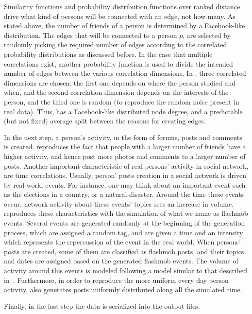 Similarity functions and probability distribution functions over ranked
distance drive what kind of persons will be connected with an edge, not how
many. As stated above, the number of friends of a person is determined by a
Facebook-like distribution. The edges that will be connected to a person $p$,
are selected by randomly picking the required number of edges according to the
correlated probability distributions as discussed before. In the case that
multiple correlations exist, another probability function is used to divide the
intended number of edges between the various correlation dimensions. In \datagen,
three correlated dimensions are chosen: the first one depends on where the
person studied and when, and the second correlation dimension depends on the
interests of the person, and the third one is random (to reproduce the random
noise present in real data). Thus, \datagen has a Facebook-like distributed node
degree, and a predictable (but not fixed) average split between the reasons for
creating edges.

In the next step, a person's activity, in the form of forums, posts and comments
is created. \datagen reproduces the fact that people with a larger number of
friends have a higher activity, and hence post more photos and comments to a
larger number of posts. Another important characteristic of real persons'
activity in social network, are time correlations.  Usually, person' posts
creation in a social network is driven by real world events.  For
instance, one may think about an important event such as the elections in a
country, or a natural disaster. Around the time these events occur, network
activity about these events' topics sees an increase in volume. \datagen
reproduces these characteristics with the simulation of what we name as
flashmob events.  Several events are generated randomly at the beginning of the
generation process, which are assigned a random tag, and are given a time and
an intensity which represents the repercussion of the event in the real world.
When persons' posts are created, some of them are classified as flashmob posts,
and their topics and dates are assigned based on the generated flashmob events.
The volume of activity around this events is modeled following a model similar
to that described in~\cite{DBLP:conf/kdd/LeskovecBKT08}. Furthermore, in order to reproduce the
more uniform every day person activity, \datagen also generates posts uniformly
distributed along all the simulated time.

Finally, in the last step the data is serialized into the output files.

